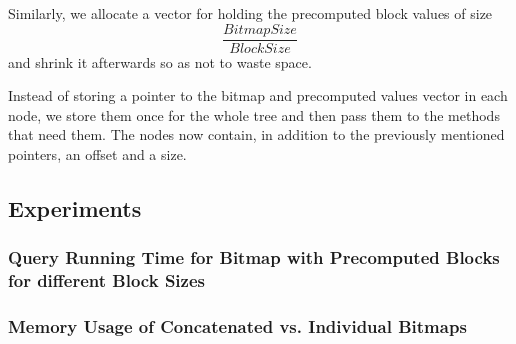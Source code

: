 Similarly, we allocate a vector for holding the precomputed block values of size
\[ \frac{BitmapSize}{BlockSize} \]
and shrink it afterwards so as not to waste space.

Instead of storing a pointer to the bitmap and precomputed values vector in each node, we store them once for the whole tree and then pass them to the methods that need them.
The nodes now contain, in addition to the previously mentioned pointers, an offset and a size.

\subsection{Experiments}
\subsubsection{Query Running Time for Bitmap with Precomputed Blocks for different Block Sizes}

\subsubsection{Memory Usage of Concatenated vs. Individual Bitmaps}